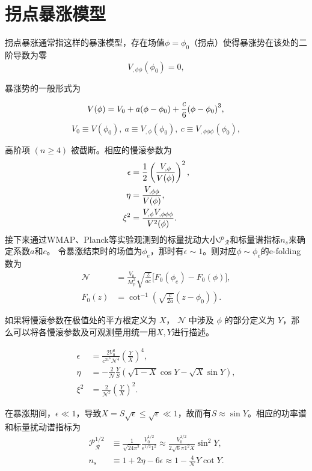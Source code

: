 \section{拐点暴涨模型}
拐点暴涨通常指这样的暴涨模型，存在场值$\phi=\phi_0$（拐点）使得暴涨势在该处的二阶导数为零
\begin{equation}
    V_{,\phi \phi}(\phi_0) = 0,
\end{equation}

暴涨势的一般形式为

\begin{equation}
    \label{eq:inf_potential}
    V (\phi)=V_0+a (\phi-\phi_0)+\frac{c}{6}{\left(\phi-\phi_0\right)}^3,\\
\end{equation}
\begin{equation}
    V_0\equiv V (\phi_0),\ a\equiv V_{,\phi} (\phi_0),\ c\equiv V_{,\phi \phi \phi}
    (\phi_0),
\end{equation}

高阶项 $(n \geq 4)$ 被截断。相应的慢滚参数为
\begin{align}
    \label{eq:psrp}
    \epsilon &= \frac{1}{2}\left(\frac{V_{,\phi}}{V(\phi)}\right)^2,\\
    \eta&=\frac{V_{,\phi \phi}}{V(\phi)}, \\
    \xi^2&=\frac{V_{,\phi} V_{,\phi \phi \phi}}{V^2(\phi)}.
\end{align}
接下来通过WMAP、Planck等实验观测到的标量扰动大小$\mathcal{P}_{\mathcal{R}}$和标量谱指标$n_s$来确定系数$a$和$c$。
令暴涨结束时的场值为$\phi_e$，那时有$\epsilon\sim
1$。则对应$\phi\sim\phi_e$的e-folding数为
\begin{align}
    \label{eq:e-folding}
    \mathcal{N} &= \frac{V_0}{M^2_p}\sqrt{\frac{2}{ac}}\lbrack
    F_0(\phi_e)-F_0(\phi)\rbrack, \\
    F_0(z) &= \cot^{-1}\left(\sqrt{\frac{c}{2a}}(z-\phi_0)\right).
\end{align}

如果将慢滚参数在极值处的平方根定义为 $X$， $\mathcal{N}$ 中涉及 $\phi$
的部分定义为 $Y$，那么可以将各慢滚参数及可观测量用统一用$X,Y$进行描述。

\begin{align}
    \epsilon &=
    \frac{2V_0^2}{c^21^6\mathcal{N}^4} {\left(\frac{Y}{X} \right)}^4, \\
    \eta &=
    -\frac{2}{\mathcal{N}}\frac{Y}{S}\left(\sqrt{1-X}\cos Y-\sqrt{X}\sin
    Y\right),\\
    \xi^2 &= \frac{2}{\mathcal{N}^2}{\left(\frac{Y}{X}\right)}^2.
\end{align}

在暴涨期间，$\epsilon \ll 1$，导致$X=S\sqrt{\epsilon}\leq\sqrt{\epsilon}\ll
1$，故而有$S\approx \sin Y$。相应的功率谱和标量扰动谱指标为
\begin{align}
  \mathcal{P}_{\mathcal{R}}^{1/2}&\equiv\frac{1}{\sqrt{24\pi^2}}\frac{V_0^{1/2}}{\epsilon^{1/2}1^2}
    \approx\frac{V_0^{1/2}}{2\sqrt{6}\pi 1^2 X}\sin^2Y,\\
    n_s&\equiv1+2\eta-6\epsilon\approx1-\frac{4}{\mathcal{N}}Y\cot Y.
\end{align}
